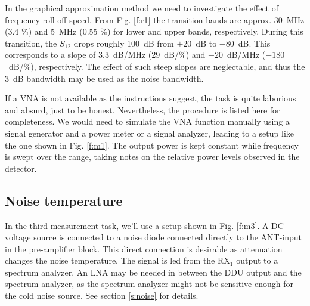 \documentclass[a4paper, 12pt]{article}
\begin{document}
In the graphical approximation method we need to investigate the effect of frequency 
roll-off speed. From Fig. \ref{f:r1} the transition bands are approx. 30~MHz (3.4 \%) 
and 5~MHz (0.55 \%) for lower and upper bands, respectively. During this transition, 
the $S_12$ drops roughly 100~dB from $+20$~dB to $-80$~dB. This corresponds to a slope 
of $3.3$~dB/MHz (29~dB/\%) and $-20$~dB/MHz ($-180$~dB/\%), respectively. The effect of 
such steep slopes are neglectable, and thus the 3~dB bandwidth may be used as the noise 
bandwidth.

If a VNA is not available as the instructions suggest, the task is quite laborious and 
absurd, just to be honest. Nevertheless, the procedure is listed here for completeness. 
We would need to simulate the VNA function manually using a signal generator and a power 
meter or a signal analyzer, leading to a setup like the one shown in Fig. \ref{f:m1}. The
output power is kept constant while frequency is swept over the range, taking notes on the 
relative power levels observed in the detector.

\begin{comment} %
\begin{table}[!h]
	\begin{center}
	\caption{Two-ports measured with the VNA.}
	\label{tbl:2p}
	\renewcommand*{\arraystretch}{1.2}
	\begin{tabular}{ll}
	\textbf{Measurement} & \textbf{Two-port} \\
	\hline
	3.1 $-$ 3.3		& SMA-cable $+$ attenuator chain $+$ N-cable $+$ required adapters \\
	3.4 (a)			& $\mathrm{TX_B \rightarrow ANT_B}$ 	\\
	3.4 (b)			& $\mathrm{TX_B \rightarrow RX_{B1}}$ 	\\
	3.4 (c)			& $\mathrm{ANT_B \rightarrow RX_{B1}}$
	\end{tabular}
	\end{center}
	\vspace*{-12pt}
\end{table}
\end{comment}


\subsection{Noise temperature}

In the third measurement task, we'll use a setup shown in Fig. \ref{f:m3}. 
A DC-voltage source is connected to a noise diode connected directly to the 
ANT-input in the pre-amplifier block. This direct connection is desirable as 
attenuation changes the noise temperature. The signal is led from the RX$_1$ 
output to a spectrum analyzer. An LNA may be needed in between the DDU output 
and the spectrum analyzer, as the spectrum analyzer might not be sensitive 
enough for the cold noise source. See section \ref{s:noise} for details.
\end{document}
